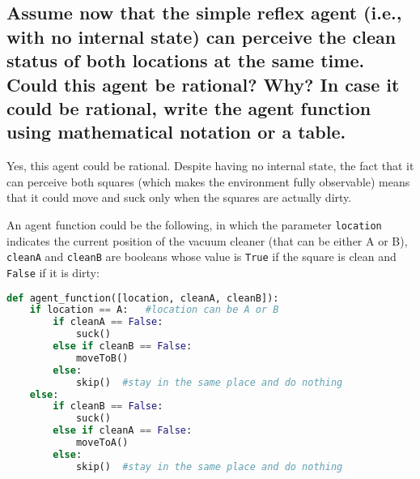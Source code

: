 \documentclass{article}
\begin{document}
\subsection{Assume now that the simple reflex agent (i.e., with no internal state) can perceive the clean status of both locations at the same time.
Could this agent be rational? Why? In case it could be rational, write the agent function using mathematical notation or a table.}
Yes, this agent could be rational.
Despite having no internal state, the fact that it can perceive both squares (which makes the environment fully observable) means that it could move and suck only when the squares are actually dirty.

An agent function could be the following, in which the parameter \texttt{location} indicates the current position of the vacuum cleaner (that can be either A or B), \texttt{cleanA} and \texttt{cleanB} are booleans whose value is \texttt{True} if the square is clean and \texttt{False} if it is dirty:
\begin{lstlisting}[language=Python]
def agent_function([location, cleanA, cleanB]):
    if location == A:	#location can be A or B
        if cleanA == False:
            suck()
        else if cleanB == False:
            moveToB()
        else:
            skip()	#stay in the same place and do nothing
    else:
        if cleanB == False:
            suck()
        else if cleanA == False:
            moveToA()
        else:
            skip()	#stay in the same place and do nothing
\end{lstlisting}


\end{document}

